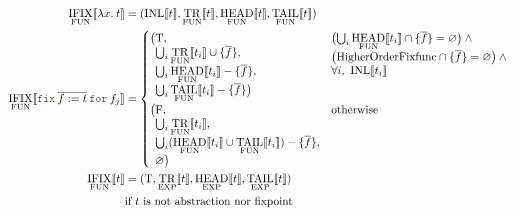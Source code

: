 \documentclass[a4paper,fleqn]{article}
\newcommand{\kwfix}{\mbox{\color{mygreen}\ttfamily fix}}
\newcommand{\kwfor}{\mbox{\color{mygreen}\ttfamily for}}
\newcommand{\lam}[2]{\lambda #1.\:#2}
\newcommand{\ofix}[2]{\kwfix\:{#1}\:\kwfor\:{#2}}
\newcommand{\tbigcup}{{\textstyle\bigcup}}
\newcommand{\BRA}[1]{\llbracket #1 \rrbracket}
\DeclareMathOperator{\TRop}{TR}
\newcommand{\TRFUN}[1]{\TRop_\text{FUN}\BRA{#1}}
\newcommand{\TREXP}[1]{\TRop_\text{EXP}\BRA{#1}}
\DeclareMathOperator{\INLop}{INL}
\newcommand{\INL}[1]{\INLop\BRA{#1}}
\DeclareMathOperator{\RNTop}{IFIX}
\newcommand{\RNTFUN}[1]{\RNTop_\text{FUN}\BRA{#1}}
\DeclareMathOperator{\MyH}{HEAD}
\DeclareMathOperator{\MyT}{TAIL}
\newcommand{\HFUN}[1]{\MyH_\text{FUN}\BRA{#1}}
\newcommand{\HEXP}[1]{\MyH_\text{EXP}\BRA{#1}}
\newcommand{\TFUN}[1]{\MyT_\text{FUN}\BRA{#1}}
\newcommand{\TEXP}[1]{\MyT_\text{EXP}\BRA{#1}}
\newcommand{\true}{\mathrm{T}}
\newcommand{\false}{\mathrm{F}}
\newcommand{\HigherOrderFixfunc}{\mathrm{HigherOrderFixfunc}}
\newcommand{\rep}[1]{\overline{#1}}
\begin{document}
\begin{align*}
  \RNTFUN{\lam{x}{t}} &= (\INL{t}, \TRFUN{t}, \HFUN{t}, \TFUN{t}) \\
  \RNTFUN{\ofix{\rep{f:=t}}{f_j}} &=
    \begin{cases}
      \begin{aligned}[t]
        \bigl(& \true, \\
              & \tbigcup_i \TRFUN{t_i} \cup \{\rep{f}\}, \\
              & \tbigcup_i \HFUN{t_i} - \{\rep{f}\}, \\
              & \tbigcup_i \TFUN{t_i} - \{\rep{f}\} \bigr)
      \end{aligned}
        & \begin{aligned}[t]
          & \bigl(\tbigcup_i \HFUN{t_i} \cap \{\rep{f}\} = \varnothing\bigr) \wedge {} \\
          & \bigl(\HigherOrderFixfunc \cap \{\rep{f}\} = \varnothing\bigr) \wedge {} \\
          & \forall i,~ \INL{t_i}
          \end{aligned} \\
      \begin{aligned}[t]
        \bigl(& \false, \\
              & \tbigcup_i \TRFUN{t_i}, \\
              & \tbigcup_i (\HFUN{t_i} \cup \TFUN{t_i}) - \{\rep{f}\}, \\
              & \varnothing \bigr)
      \end{aligned}
        & \text{otherwise}
    \end{cases} \\
  \RNTFUN{t} &= (\true, \TREXP{t}, \HEXP{t}, \TEXP{t}) \\
    & \text{if}~\text{$t$ is not abstraction nor fixpoint}
\end{align*}
\end{document}
